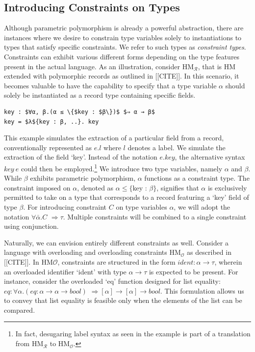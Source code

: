 \documentclass[runningheads]{llncs}
\begin{document}
\subsection{Introducing Constraints on Types}
Although parametric polymorphism is already a powerful abstraction, there are
instances where we desire to constrain type variables solely to instantiations
to types that satisfy specific constraints.
We refer to such types as \emph{constraint types}.
Constraints can exhibit various different forms depending on the type features
present in the actual language.
As an illustration, consider HM$_{\mathcal{R}}$, that is HM extended with
polymorphic records as outlined in [[CITE]].
In this scenario, it becomes valuable to have the capability to specify that a
type variable $α$
should solely be instantiated as a record type containing specific fields.
\begin{example}
  \begin{lstlisting}
key : $∀α, β.(α ≤ \{$key : $β\})$ $⇒ α → β$
key = $λ${key : β, ..}. key
  \end{lstlisting}
\end{example}
This example simulates the extraction of a particular field from a record,
conventionally
represented as $e.l$ where $l$ denotes a label.
We simulate the extraction of  the field `key'.
Instead of the notation $e.key$, the alternative syntax $key \ e$ could then be
employed.\footnote{
  In fact, desugaring label syntax as seen in the example
  is part of a translation from HM$_{\mathcal{R}}$ to HM$_{\mathcal{O}}$.
}
We introduce two type variables, namely $α$ and $β$. While $β$ exhibits
parametric polymorphism, $α$ functions as a constraint type.
The constraint imposed on $α$, denoted as $α ≤ \{$key : $β\}$, signifies that
$α$ is exclusively permitted to take on a type that corresponds to a record
featuring a `key' field of type $β$.
For introducing constraint $C$ on type variables $α$, we will adopt the
notation $∀\bar{α}.C$ $⇒ τ$.
Multiple constraints will be combined to a single
constraint using conjunction.

Naturally, we can envision entirely different constraints as well.
Consider a language with overloading and overloading constraints
HM$_{\mathcal{O}}$ as described in [[CITE]].
In HM${\mathcal{O}}$, constraints are structured in the form $ident : α → τ$,
wherein an overloaded identifier `ident' with type $α → τ$ is
expected to be present. For instance, consider the overloaded `eq' function
designed for list equality: $eq : ∀α.(eq : α → α → bool)$ $⇒ [α] → [α] → bool$.
This formulation allows us to convey that list equality is feasible only when
the elements of the list can be compared.
\end{document}
